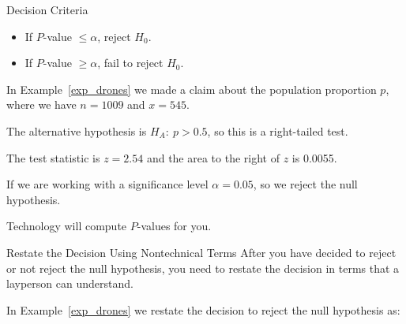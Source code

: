 \documentclass{beamer}
\newcommand{\althypothesis}[1]{H_A:~{#1}}
\begin{document}
\begin{frame}
\begin{block}{Decision Criteria}
\begin{itemize}
\item If $P$-value $\leq\alpha$, reject $H_0$.
\item If $P$-value $\geq\alpha$, fail to reject $H_0$.
\end{itemize}
\end{block}\pause

\begin{example}
In Example~\ref{exp_drones} we made a claim about the population proportion $p$, where we have $n=1009$ and $x=545$.\pause

\vspace{2mm}
The alternative hypothesis is $\althypothesis{p>0.5}$, so this is a right-tailed test.\pause

\vspace{2mm}
The test statistic is $z=2.54$ and the area to the right of $z$ is 0.0055.\pause

\vspace{2mm}
If we are working with a significance level $\alpha=0.05$, so we reject the null hypothesis.
\end{example}\pause

\begin{note}
Technology will compute $P$-values for you.
\end{note}
\end{frame}

\begin{frame}
\begin{block}{Restate the Decision Using Nontechnical Terms}
After you have decided to reject or not reject the null hypothesis, you need to restate the decision in terms that a layperson can understand.
\end{block}\pause

\begin{example}
In Example~\ref{exp_drones} we restate the decision to reject the null hypothesis as:
\begin{center}
\end{center}
\end{example}
\end{frame}
\end{document}
